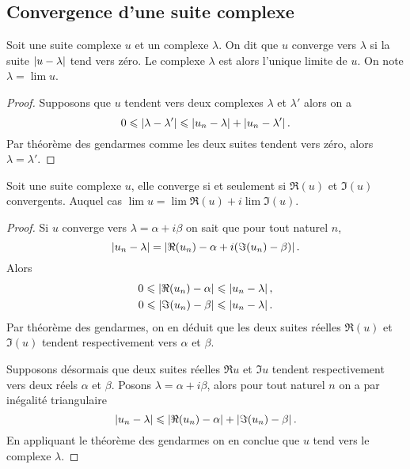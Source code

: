 \subsection{Convergence d'une suite complexe}

\begin{defdef}
  Soit une suite complexe \(u\) et un complexe \(\lambda\). On dit que \(u\) converge vers \(\lambda\) si la suite \(\left\lvert u-\lambda\right\rvert\) tend vers zéro. Le complexe \(\lambda\) est alors l'unique limite de \(u\). On note \(\lambda = \lim u\).
\end{defdef}
\begin{proof}
  Supposons que \(u\) tendent vers deux complexes \(\lambda\) et \(\lambda'\) alors on a
  \begin{equation}
    0 \leqslant \left\lvert\lambda - \lambda'\right\rvert \leqslant \left\lvert u_n-\lambda\right\rvert + \left\lvert u_n-\lambda'\right\rvert.
  \end{equation}
Par théorème des gendarmes comme les deux suites tendent vers zéro, alors \(\lambda=\lambda'\).
\end{proof}

\begin{prop}
  Soit une suite complexe \(u\), elle converge si et seulement si \(\Re(u)\) et \(\Im(u)\) convergents. Auquel cas \(\lim u = \lim \Re(u) + i \lim \Im(u)\).
\end{prop}
\begin{proof}
  Si \(u\) converge vers \(\lambda=\alpha+ i \beta\) on sait que pour tout naturel \(n\), 
  \begin{equation}
  \left\lvert u_n-\lambda\right\rvert=\left\lvert\Re(u_n)-\alpha + i(\Im(u_n)-\beta)\right\rvert. 
  \end{equation}
  Alors
  \begin{align}
    0 \leqslant \left\lvert\Re(u_n) -\alpha\right\rvert \leqslant \left\lvert u_n-\lambda\right\rvert, \\ 
    0 \leqslant \left\lvert\Im(u_n) -\beta\right\rvert \leqslant \left\lvert u_n-\lambda\right\rvert.
  \end{align}
  Par théorème des gendarmes, on en déduit que les deux suites réelles \(\Re(u)\) et \(\Im(u)\) tendent respectivement vers \(\alpha\) et \(\beta\).

  Supposons désormais que deux suites réelles \(\Re u\) et \(\Im u\) tendent respectivement vers deux réels \(\alpha\) et \(\beta\). Posons \(\lambda = \alpha + i \beta\), alors pour tout naturel \(n\) on a par inégalité triangulaire
\begin{equation}
  \left\lvert u_n-\lambda\right\rvert \leqslant \left\lvert\Re(u_n) - \alpha\right\rvert + \left\lvert\Im(u_n) - \beta\right\rvert.
\end{equation}
En appliquant le théorème des gendarmes on en conclue que \(u\) tend vers le complexe \(\lambda\).
\end{proof}

